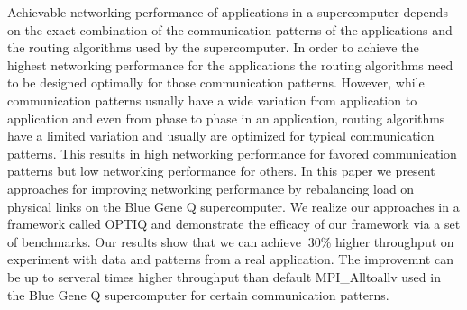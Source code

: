 Achievable networking performance of applications in a supercomputer depends on the exact combination of the communication patterns of the applications and the routing algorithms used by the supercomputer. In order to achieve the highest networking performance for the applications the routing algorithms need to be designed optimally for those communication patterns. However, while communication patterns usually have a wide variation from application to application and even from phase to phase in an application, routing algorithms have a limited variation and usually are optimized for typical communication patterns. This results in high networking performance for favored communication patterns but low networking performance for others. In this paper we present approaches for improving networking performance by rebalancing load on physical links on the Blue Gene Q supercomputer. We realize our approaches in a framework called OPTIQ and demonstrate the efficacy of our framework via a set of benchmarks. Our results show that we can achieve $~$30\% higher throughput on experiment with data and patterns from a real application. The improvemnt can be up to serveral times higher throughput than default MPI\_Alltoallv used in the Blue Gene Q supercomputer for certain communication patterns.

